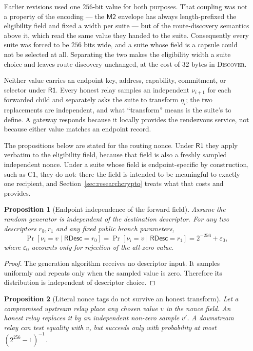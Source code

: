 \documentclass[11pt,oneside]{article}
\newcommand{\Rone}{\ensuremath{\mathsf{R1}}}
\newcommand{\Mtwo}{\ensuremath{\mathsf{M2}}}
\newtheorem{proposition}{Proposition}
\begin{document}
Earlier revisions used one $256$-bit value for both purposes. That coupling was not a property of the encoding --- the \Mtwo{} envelope has always length-prefixed the eligibility field and fixed a width per suite --- but of the route-discovery semantics above it, which read the same value they handed to the suite. Consequently every suite was forced to be $256$ bits wide, and a suite whose field is a capsule could not be selected at all. Separating the two makes the eligibility width a suite choice and leaves route discovery unchanged, at the cost of $32$ bytes in \textsc{Discover}.

Neither value carries an endpoint key, address, capability, commitment, or selector under \Rone{}. Every honest relay samples an independent $\nu_{i+1}$ for each forwarded child and separately asks the suite to transform $\eta_i$; the two replacements are independent, and what ``transform'' means is the suite's to define. A gateway responds because it locally provides the rendezvous service, not because either value matches an endpoint record.

The propositions below are stated for the routing nonce. Under \Rone{} they apply verbatim to the eligibility field, because that field is also a freshly sampled independent nonce. Under a suite whose field is endpoint-specific by construction, such as C1, they do not: there the field is intended to be meaningful to exactly one recipient, and Section~\ref{sec:researchcrypto} treats what that costs and provides.

\begin{proposition}[Endpoint independence of the forward field]
Assume the random generator is independent of the destination descriptor. For any two descriptors $r_0,r_1$ and any fixed public branch parameters,
\begin{equation}
\Pr[\nu_i=v\mid\mathsf{RDesc}=r_0]
=
\Pr[\nu_i=v\mid\mathsf{RDesc}=r_1]
=2^{-256}+\varepsilon_0,
\end{equation}
where $\varepsilon_0$ accounts only for rejection of the all-zero value.
\end{proposition}

\begin{proof}
The generation algorithm receives no descriptor input. It samples uniformly and repeats only when the sampled value is zero. Therefore its distribution is independent of descriptor choice.
\end{proof}

\begin{proposition}[Literal nonce tags do not survive an honest transform]
Let a compromised upstream relay place any chosen value $v$ in the nonce field. An honest relay replaces it by an independent non-zero sample $v'$. A downstream relay can test equality with $v$, but succeeds only with probability at most $(2^{256}-1)^{-1}$.
\end{proposition}
\end{document}
